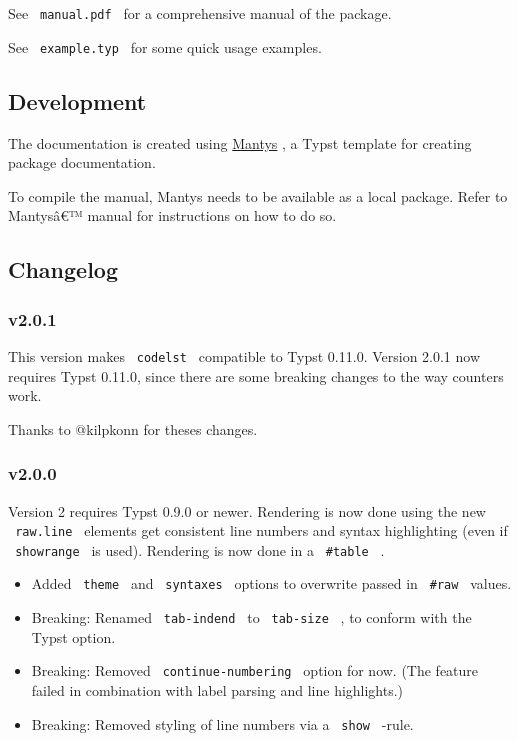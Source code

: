 See \texttt{\ manual.pdf\ } for a comprehensive manual of the package.

See \texttt{\ example.typ\ } for some quick usage examples.

\subsection{Development}\label{development}

The documentation is created using
\href{https://github.com/jneug/typst-mantys}{Mantys} , a Typst template
for creating package documentation.

To compile the manual, Mantys needs to be available as a local package.
Refer to Mantysâ€™ manual for instructions on how to do so.

\subsection{Changelog}\label{changelog}

\subsubsection{v2.0.1}\label{v2.0.1}

This version makes \texttt{\ codelst\ } compatible to Typst 0.11.0.
Version 2.0.1 now requires Typst 0.11.0, since there are some breaking
changes to the way counters work.

Thanks to @kilpkonn for theses changes.

\subsubsection{v2.0.0}\label{v2.0.0}

Version 2 requires Typst 0.9.0 or newer. Rendering is now done using the
new \texttt{\ raw.line\ } elements get consistent line numbers and
syntax highlighting (even if \texttt{\ showrange\ } is used). Rendering
is now done in a \texttt{\ \#table\ } .

\begin{itemize}
\tightlist
\item
  Added \texttt{\ theme\ } and \texttt{\ syntaxes\ } options to
  overwrite passed in \texttt{\ \#raw\ } values.
\item
  Breaking: Renamed \texttt{\ tab-indend\ } to \texttt{\ tab-size\ } ,
  to conform with the Typst option.
\item
  Breaking: Removed \texttt{\ continue-numbering\ } option for now. (The
  feature failed in combination with label parsing and line highlights.)
\item
  Breaking: Removed styling of line numbers via a \texttt{\ show\ }
  -rule.
\end{itemize}

